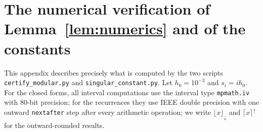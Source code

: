 \documentclass[11pt]{amsart}
\theoremstyle{remark}
\begin{document}
\appendix
\section{The numerical verification of Lemma~\ref{lem:numerics} and of the constants}\label{app:numerics}

This appendix describes precisely what is computed by the two scripts \texttt{certify\_modular.py} and \texttt{singular\_constant.py}. Let $h_0=10^{-3}$ and $s_i=ih_0$. For the closed forms, all interval computations use the interval type \texttt{mpmath.iv} with $80$-bit precision; for the recurrences they use IEEE double precision with one outward \texttt{nextafter} step after every arithmetic operation; we write $\lfloor x\rfloor_\downarrow$ and $\lceil x\rceil^\uparrow$ for the outward-rounded results.
\end{document}
